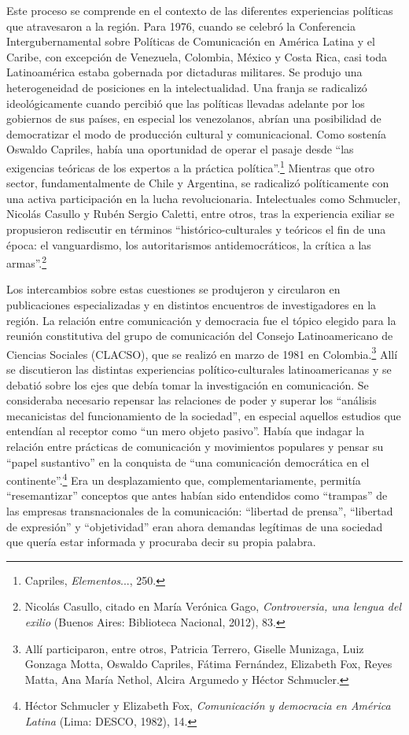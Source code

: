 \documentclass{tufte-handout}
\begin{document}
Este proceso se comprende en el contexto de las diferentes experiencias
políticas que atravesaron a la región. Para 1976, cuando se celebró la
Conferencia Intergubernamental sobre Políticas de Comunicación en
América Latina y el Caribe, con excepción de Venezuela, Colombia, México
y Costa Rica, casi toda Latinoamérica estaba gobernada por dictaduras
militares. Se produjo una heterogeneidad de posiciones en la
intelectualidad. Una franja se radicalizó ideológicamente cuando
percibió que las políticas llevadas adelante por los gobiernos de sus
países, en especial los venezolanos, abrían una posibilidad de
democratizar el modo de producción cultural y comunicacional. Como
sostenía Oswaldo Capriles, había una oportunidad de operar el pasaje
desde ``las exigencias teóricas de los expertos a la práctica
política''.\footnote{Capriles, \emph{Elementos}..., 250.} Mientras que
otro sector, fundamentalmente de Chile y Argentina, se radicalizó
políticamente con una activa participación en la lucha revolucionaria.
Intelectuales como Schmucler, Nicolás Casullo y Rubén Sergio Caletti,
entre otros, tras la experiencia exiliar se propusieron rediscutir en
términos ``histórico-culturales y teóricos el fin de una época: el
vanguardismo, los autoritarismos antidemocráticos, la crítica a las
armas''.\footnote{Nicolás Casullo, citado en María Verónica Gago,
  \emph{Controversia, una lengua del exilio} (Buenos Aires: Biblioteca
  Nacional, 2012), 83.}

Los intercambios sobre estas cuestiones se produjeron y circularon en
publicaciones especializadas y en distintos encuentros de investigadores
en la región. La relación entre comunicación y democracia fue el tópico
elegido para la reunión constitutiva del grupo de comunicación del
Consejo Latinoamericano de Ciencias Sociales (CLACSO), que se realizó en
marzo de 1981 en Colombia.\footnote{Allí participaron, entre otros,
  Patricia Terrero, Giselle Munizaga, Luiz Gonzaga Motta, Oswaldo
  Capriles, Fátima Fernández, Elizabeth Fox, Reyes Matta, Ana María
  Nethol, Alcira Argumedo y Héctor Schmucler.} Allí se discutieron las
distintas experiencias político-culturales latinoamericanas y se debatió
sobre los ejes que debía tomar la investigación en comunicación. Se
consideraba necesario repensar las relaciones de poder y superar los
``análisis mecanicistas del funcionamiento de la sociedad'', en especial
aquellos estudios que entendían al receptor como ``un mero objeto
pasivo''. Había que indagar la relación entre prácticas de comunicación
y movimientos populares y pensar su ``papel sustantivo'' en la conquista
de ``una comunicación democrática en el continente''.\footnote{Héctor
  Schmucler y Elizabeth Fox, \emph{Comunicación y democracia en América
  Latina} (Lima: DESCO, 1982), 14.} Era un desplazamiento que,
complementariamente, permitía ``resemantizar'' conceptos que antes
habían sido entendidos como ``trampas'' de las empresas transnacionales
de la comunicación: ``libertad de prensa'', ``libertad de expresión'' y
``objetividad'' eran ahora demandas legítimas de una sociedad que quería
estar informada y procuraba decir su propia palabra.
\end{document}
